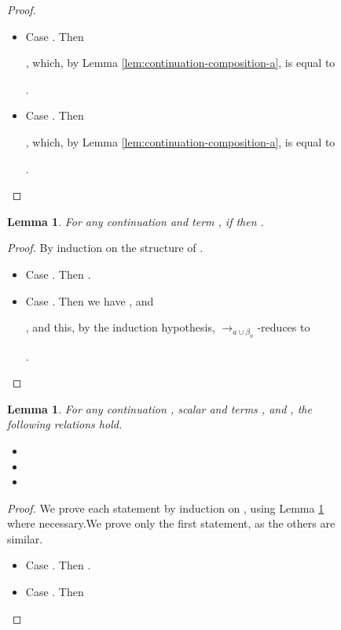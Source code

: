 \documentclass{LMCS}
\newtheorem{lemma}[theorem]{Lemma}
\newcommand{\xto}[1]{\ensuremath{\rightarrow_{#1}}}
\newcommand{\tobalgred}{\xto{a\cup\beta_n}}
\begin{document}
\begin{figure}
{\begin{proof}
\begin{itemize}
      ,
      which, by Lemma \ref{lem:continuation-composition-a}, is equal to
      
      .

    \item Case . Then 
      
      ,
      which, by Lemma \ref{lem:continuation-composition-a}, is equal to
      
      .

    \item Case . Then 
      
      ,
      which, by Lemma \ref{lem:continuation-composition-a}, is equal to
      
      .
      \qedhere
  \end{itemize}
\end{proof}

\begin{lemma}
  \label{lem:continuation-step-a}For any continuation  and term
  , if  then .
\end{lemma}
\begin{proof}
  By induction on the structure of .
  \begin{itemize}
    \item Case . Then .
    \item Case . Then we have , and 
      
      ,
      and this, by the induction hypothesis, \tobalgred-reduces to 
      
      .
      \qedhere
  \end{itemize}
\end{proof}

\begin{lemma}
  \label{lem:continuation-linearity-a}
  For any continuation , scalar  and terms ,  and , the following relations hold.
  \begin{itemize}
    \item 
    \item 
    \item 
  \end{itemize}
\end{lemma}

\begin{proof}
  We prove each statement by induction on , using Lemma \ref{lem:continuation-step-a}
  where necessary.We prove only the first statement, as the others
  are similar.
  \begin{itemize}
    \item Case . Then .
    \item Case . Then 
      

\end{itemize}
\end{proof}}
\end{figure}
\end{document}
